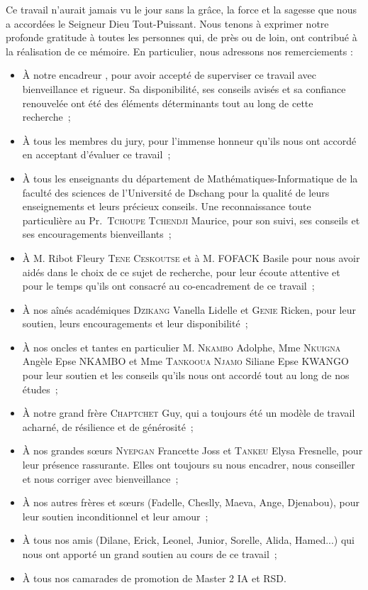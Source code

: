 Ce travail n'aurait jamais vu le jour sans la gr\^ace, la force et la sagesse que nous a accord\'ees le Seigneur Dieu Tout-Puissant. Nous tenons \`a exprimer notre profonde gratitude \`a toutes les personnes qui, de pr\`es ou de loin, ont contribu\'e \`a la r\'ealisation de ce m\'emoire. En particulier, nous adressons nos remerciements :

\begin{itemize}
\item \`A notre encadreur \textbf{\thesisSupervisor}, pour avoir accept\'e de superviser ce travail avec bienveillance et rigueur. Sa disponibilit\'e, ses conseils avis\'es et sa confiance renouvel\'ee ont \'et\'e des \'el\'ements d\'eterminants tout au long de cette recherche~;
\item \`A tous les membres du jury, pour l'immense honneur qu'ils nous ont accord\'e en acceptant d'\'evaluer ce travail~;
\item \`A tous les enseignants du d\'epartement de Math\'ematiques-Informatique de la facult\'e des sciences de l'Universit\'e de Dschang pour la qualit\'e de leurs enseignements et leurs pr\'ecieux conseils. Une reconnaissance toute particuli\`ere au Pr.~\textsc{Tchoupe Tchendji} Maurice, pour son suivi, ses conseils et ses encouragements bienveillants~;
\item \`A M. Ribot Fleury \textsc{Tene Ceskoutse} et \`a M. \textsc{FOFACK} Basile pour nous avoir aid\'es dans le choix de ce sujet de recherche, pour leur \'ecoute attentive et pour le temps qu'ils ont consacr\'e au co-encadrement de ce travail~;
\item \`A nos a\^in\'es acad\'emiques \textsc{Dzikang} Vanella Lidelle et \textsc{Genie} Ricken, pour leur soutien, leurs encouragements et leur disponibilit\'e~;
\item \`A nos oncles et tantes en particulier M. \textsc{Nkambo} Adolphe, Mme \textsc{Nkuigna} Ang\`ele Epse NKAMBO et Mme \textsc{Tankooua Njamo} Siliane Epse KWANGO pour leur soutien et les conseils qu'ils nous ont accord\'e tout au long de nos \'etudes~;
\item \`A notre grand fr\`ere \textsc{Chaptchet} Guy, qui a toujours \'et\'e un mod\`ele de travail acharn\'e, de r\'esilience et de g\'en\'erosit\'e~;
\item \`A nos grandes s\oe urs \textsc{Nyepgan} Francette Joss et \textsc{Tankeu} Elysa Fresnelle, pour leur pr\'esence rassurante. Elles ont toujours su nous encadrer, nous conseiller et nous corriger avec bienveillance~;
\item \`A nos autres fr\`eres et s\oe urs (Fadelle, Cheslly, Maeva, Ange, Djenabou), pour leur soutien inconditionnel et leur amour~;
\item \`A tous nos amis (Dilane, Erick, Leonel, Junior, Sorelle, Alida, Hamed...) qui nous ont apport\'e un grand soutien au cours de ce travail~;
\item \`A tous nos camarades de promotion de Master 2 IA et RSD.
\end{itemize}

\myCleanStarChapterEnd
